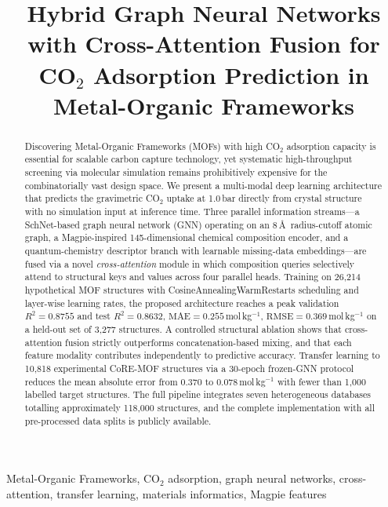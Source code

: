\documentclass[conference]{IEEEtran}
\title{Hybrid Graph Neural Networks with Cross-Attention Fusion
       for CO$_2$ Adsorption Prediction in Metal-Organic Frameworks}
\author{%
  \IEEEauthorblockN{Kesavadatta}
  \IEEEauthorblockA{\textit{Department of Computer Science and Engineering}\\
    \textit{[Institution Name, City, Country]}}}
\begin{document}
\maketitle

\begin{abstract}
Discovering Metal-Organic Frameworks (MOFs) with high CO$_2$ adsorption capacity
is essential for scalable carbon capture technology, yet systematic high-throughput
screening via molecular simulation remains prohibitively expensive for the
combinatorially vast design space.  We present a multi-modal deep learning
architecture that predicts the gravimetric CO$_2$ uptake at 1.0\,bar directly
from crystal structure with no simulation input at inference time.  Three
parallel information streams—a SchNet-based graph neural network (GNN) operating
on an 8\,\AA\ radius-cutoff atomic graph, a Magpie-inspired 145-dimensional
chemical composition encoder, and a quantum-chemistry descriptor branch with
learnable missing-data embeddings—are fused via a novel \emph{cross-attention}
module in which composition queries selectively attend to structural keys and
values across four parallel heads.  Training on 26{,}214 hypothetical MOF
structures with CosineAnnealingWarmRestarts scheduling and layer-wise learning
rates, the proposed architecture reaches a peak validation $R^2=0.8755$ and
test $R^2=0.8632$, $\text{MAE}=0.255$\,mol\,kg$^{-1}$,
$\text{RMSE}=0.369$\,mol\,kg$^{-1}$ on a held-out set of 3{,}277 structures.
A controlled structural ablation shows that cross-attention fusion strictly
outperforms concatenation-based mixing, and that each feature modality
contributes independently to predictive accuracy.  Transfer learning to
10{,}818 experimental CoRE-MOF structures via a 30-epoch frozen-GNN protocol
reduces the mean absolute error from 0.370 to 0.078\,mol\,kg$^{-1}$ with fewer
than 1{,}000 labelled target structures.  The full pipeline integrates seven
heterogeneous databases totalling approximately 118{,}000 structures, and the
complete implementation with all pre-processed data splits is publicly available.
\end{abstract}

\begin{IEEEkeywords}
Metal-Organic Frameworks, CO$_2$ adsorption, graph neural networks,
cross-attention, transfer learning, materials informatics, Magpie features
\end{IEEEkeywords}
\end{document}
